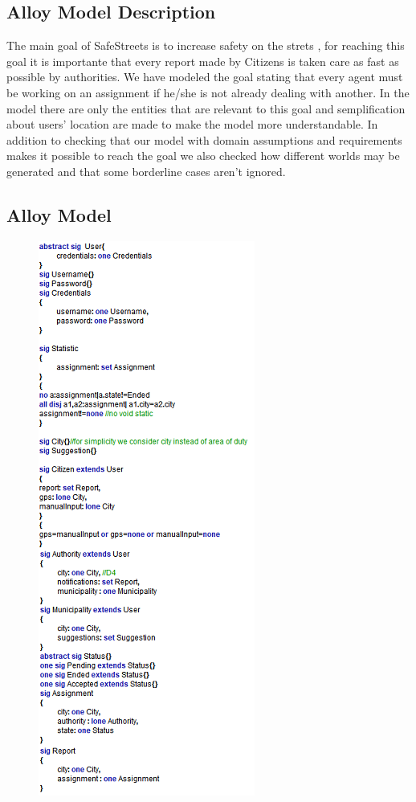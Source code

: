 \subsection{Alloy Model Description}
The main goal of SafeStreets is to increase safety on the strets , for reaching this goal it is importante that every report made by Citizens is taken care as fast as possible by authorities. We have modeled the goal stating that every agent must be working on an assignment if he/she is not already dealing with another. In the model there are only the entities that are relevant to this goal and semplification about users' location are made to make the model more understandable.
In addition to checking that our model with domain assumptions and requirements makes it possible to reach the goal we also checked how different worlds may be generated and that some borderline cases aren't ignored.
\newpage
\subsection{Alloy Model}
\begin{figure}[h]
\centering
\includegraphics{Images/alsignatures.png}
\end{figure}

